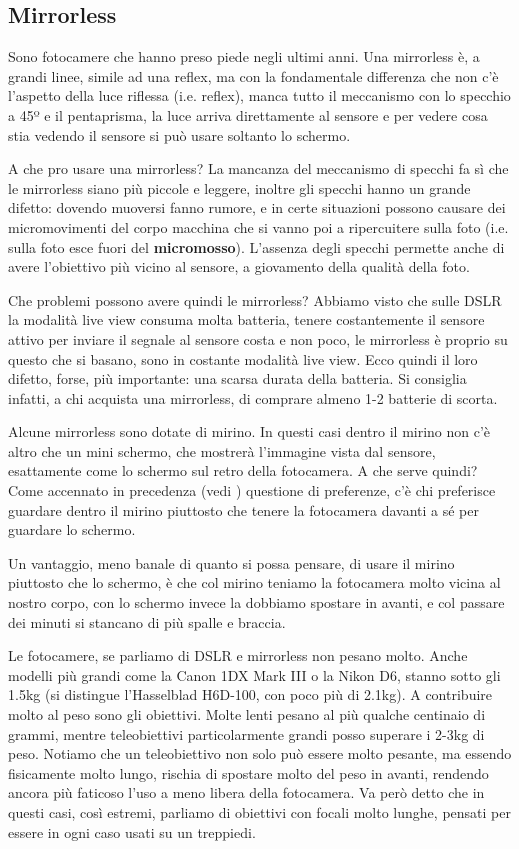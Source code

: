 \subsection{Mirrorless} \label{subsec:mirrorless}
Sono fotocamere che hanno preso piede negli ultimi anni. Una mirrorless è, a grandi linee, simile ad una reflex, ma con la fondamentale differenza che non c'è l'aspetto della luce riflessa (i.e. reflex), manca tutto il meccanismo con lo specchio a 45º e il pentaprisma, la luce arriva direttamente al sensore e per vedere cosa stia vedendo il sensore si può usare soltanto lo schermo.

A che pro usare una mirrorless? La mancanza del meccanismo di specchi fa sì che le mirrorless siano più piccole e leggere, inoltre gli specchi hanno un grande difetto: dovendo muoversi fanno rumore, e in certe situazioni possono
causare dei micromovimenti del corpo macchina che si vanno poi a ripercuitere sulla foto (i.e. sulla foto esce fuori del \textbf{micromosso}).\newline
L'assenza degli specchi permette anche di avere l'obiettivo più vicino al sensore, a giovamento della qualità della foto.

Che problemi possono avere quindi le mirrorless? Abbiamo visto che sulle DSLR la modalità live view consuma molta batteria, tenere costantemente il sensore attivo per inviare il segnale al sensore costa e non poco, le mirrorless è proprio su questo che si basano, sono in costante modalità live view. Ecco quindi il loro difetto, forse, più importante: una scarsa durata della batteria. Si consiglia infatti, a chi acquista una mirrorless, di comprare almeno 1-2 batterie di scorta.

Alcune mirrorless sono dotate di mirino. In questi casi dentro il mirino non c'è altro che un mini schermo, che mostrerà l'immagine vista dal sensore, esattamente come lo schermo sul retro della fotocamera.
A che serve quindi? Come accennato in precedenza (vedi ) questione di preferenze, c'è chi preferisce guardare dentro il mirino piuttosto che tenere la fotocamera davanti a sé per guardare lo schermo.

Un vantaggio, meno banale di quanto si possa pensare, di usare il mirino piuttosto che lo schermo, è che col mirino teniamo la fotocamera molto vicina al nostro corpo, con lo schermo invece la dobbiamo spostare in avanti, e col passare dei minuti si stancano di più spalle e braccia.

Le fotocamere, se parliamo di DSLR e mirrorless non pesano molto. Anche modelli più grandi come la Canon 1DX Mark III o la Nikon D6, stanno sotto gli 1.5kg (si distingue l'Hasselblad H6D-100, con poco più di 2.1kg).
A contribuire molto al peso sono gli obiettivi. Molte lenti pesano al più qualche centinaio di grammi, mentre teleobiettivi particolarmente grandi posso superare i 2-3kg di peso.
Notiamo che un teleobiettivo non solo può essere molto pesante, ma essendo fisicamente molto lungo, rischia di spostare molto del peso in avanti, rendendo ancora più faticoso l'uso a meno libera della fotocamera.
Va però detto che in questi casi, così estremi, parliamo di obiettivi con focali molto lunghe, pensati per essere in ogni caso usati su un treppiedi.

